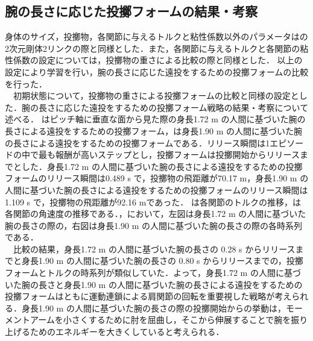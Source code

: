 \begin{small}
\subsection{腕の長さに応じた投擲フォームの結果・考察}
身体のサイズ，投擲物，各関節に与えるトルクと粘性係数以外のパラメータはの2次元剛体2リンクの際と同様とした．また，各関節に与えるトルクと各関節の粘性係数の設定については，投擲物の重さによる比較の際と同様とした．
以上の設定により学習を行い，腕の長さに応じた遠投をするための投擲フォームの比較を行った．\\
　初期状態について，投擲物の重さによる投擲フォームの比較と同様の設定とした．腕の長さに応じた遠投をするための投擲フォーム戦略の結果・考察について述べる．
はピッチ軸に垂直な面から見た際の身長1.72 m の人間に基づいた腕の長さによる遠投をするための投擲フォーム，は身長1.90 m の人間に基づいた腕の長さによる遠投をするための投擲フォームである．リリース瞬間は1エピソードの中で最も報酬が高いステップとし，投擲フォームは投擲開始からリリースまでとした．身長1.72 m の人間に基づいた腕の長さによる遠投をするための投擲フォームのリリース瞬間は0.489 s で，投擲物の飛距離が70.17 m，身長1.90 m の人間に基づいた腕の長さによる遠投をするための投擲フォームのリリース瞬間は1.109 s で，投擲物の飛距離が92.16 mであった．
は各関節のトルクの推移，は各関節の角速度の推移である．，において，左図は身長1.72 m の人間に基づいた腕の長さの際の，右図は身長1.90 m の人間に基づいた腕の長さの際の各時系列である．\\
　比較の結果，身長1.72 m の人間に基づいた腕の長さの 0.28 s からリリースまでと身長1.90 m の人間に基づいた腕の長さの 0.80 s からリリースまでの，投擲フォームとトルクの時系列が類似していた．よって，身長1.72 m の人間に基づいた腕の長さと身長1.90 m の人間に基づいた腕の長さによる遠投をするための投擲フォームはともに運動連鎖による肩関節の回転を重要視した戦略が考えられる．身長1.90 m の人間に基づいた腕の長さの際の投擲開始からの挙動は，モーメントアームを小さくするために肘を屈曲し，そこから伸展することで腕を振り上げるためのエネルギーを大きくしていると考えられる．

\end{small}

